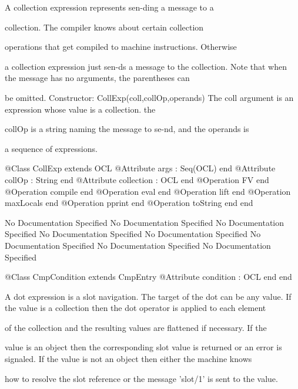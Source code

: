       A collection expression represents sen-ding a message to a

      collection. The compiler knows about certain collection

      operations that get compiled to machine instructions. Otherwise

      a collection expression just sen-ds a message to the collection.
      Note that when the message has no arguments, the parentheses can

      be omitted.
      Constructor: CollExp(coll,collOp,operands)
        The coll argument is an expression whose value is a collection. the

        collOp is a string naming the message to se-nd, and the operands is

        a sequence of expressions.
\begin{Interface}
@Class CollExp extends OCL
  @Attribute args : Seq(OCL) end
  @Attribute collOp : String end
  @Attribute collection : OCL end
  @Operation FV end
  @Operation compile end
  @Operation eval end
  @Operation lift end
  @Operation maxLocals end
  @Operation pprint end
  @Operation toString end
end
\end{Interface}
No Documentation Specified
No Documentation Specified
No Documentation Specified
No Documentation Specified
No Documentation Specified
No Documentation Specified
No Documentation Specified
No Documentation Specified
\begin{Interface}
@Class CmpCondition extends CmpEntry
  @Attribute condition : OCL end
end
\end{Interface}

      A dot expression is a slot navigation. The target of the dot can be any value.
      If the value is a collection then the dot operator is applied to each element

      of the collection and the resulting values are flattened if necessary. If the

      value is an object then the corresponding slot value is returned or an 
      error is signaled. If the value is not an object then either the machine knows

      how to resolve the slot reference or the message 'slot/1' is sent to the 
      value.
      

